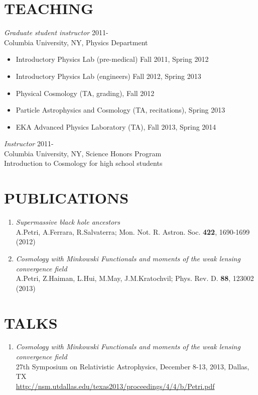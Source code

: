 \documentclass[margin, 10pt]{res} %
\begin{document}
\begin{resume}
\section{TEACHING} 
{\sl Graduate student instructor} \hfill 2011-\\ 
Columbia University, NY, Physics Department 
\begin{itemize}
\item Introductory Physics Lab (pre-medical) Fall 2011, Spring 2012
\item Introductory Physics Lab (engineers) Fall 2012, Spring 2013
\item Physical Cosmology (TA, grading), Fall 2012
\item Particle Astrophysics and Cosmology (TA, recitations), Spring 2013 
\item EKA Advanced Physics Laboratory (TA), Fall 2013, Spring 2014 
\end{itemize}

{\sl Instructor} \hfill 2011- \\
Columbia University, NY, Science Honors Program\\
Introduction to Cosmology for high school students

\section{PUBLICATIONS}
\begin{enumerate}
\item {\sl Supermassive black hole ancestors} \\
A.Petri, A.Ferrara, R.Salvaterra; Mon. Not. R. Astron. Soc. \textbf{422}, 1690-1699 (2012)
\item {\sl Cosmology with Minkowski Functionals and moments of the weak lensing convergence field} \\
A.Petri, Z.Haiman, L.Hui, M.May, J.M.Kratochvil; Phys. Rev. D. \textbf{88}, 123002 (2013)
\end{enumerate}

\section{TALKS}
\begin{enumerate}
\item{\sl Cosmology with Minkowski Functionals and moments of the weak lensing convergence field}\\
27th Symposium on Relativistic Astrophysics, December 8-13, 2013, Dallas, TX \\
\url{http://nsm.utdallas.edu/texas2013/proceedings/4/4/b/Petri.pdf}
\end{enumerate}


\end{resume}
\end{document}
